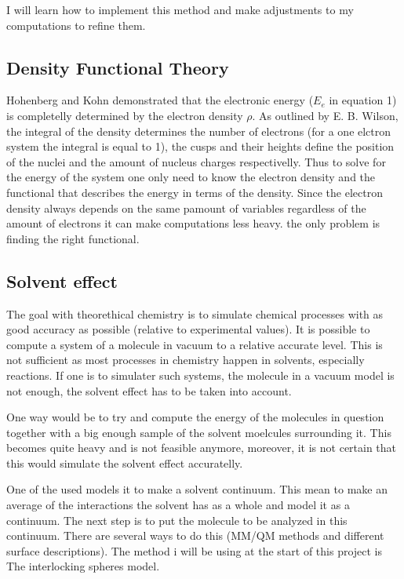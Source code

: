 \documentclass[a4paper,11pt]{article}
\begin{document}
I will learn how to implement this method and make adjustments to my computations to refine them.

\subsection{Density Functional Theory}

Hohenberg and Kohn %
demonstrated that the
electronic energy ($E_e$ in equation 1) is completelly determined by
the electron density $\rho$\cite{parr1994density}. As outlined by E. B. Wilson, %
the integral of the
density determines the number of electrons (for a one elctron system
the integral is equal to 1), the cusps and their heights define the
position of the nuclei and the amount of nucleus charges
respectivelly.  Thus to solve for the energy of the system one only
need to know the electron density and the functional that describes
the energy in terms of the density. Since the electron density always
depends on the same pamount of variables regardless of the amount of
electrons it can make computations less heavy. the only problem is
finding the right functional.


\subsection{Solvent effect}

The goal with theorethical chemistry is to simulate chemical processes
with as good accuracy as possible (relative to experimental
values). It is possible to compute a system of a molecule in vacuum to
a relative accurate level. This is not sufficient as most processes in
chemistry happen in solvents, especially reactions. If one is to
simulater such systems, the molecule in a vacuum model is not enough,
the solvent effect has to be taken into account.

One way would be to try and compute the energy of the molecules in
question together with a big enough sample of the solvent moelcules
surrounding it. This becomes quite heavy and is not feasible anymore,
moreover, it is not certain that this would simulate the solvent
effect accuratelly.

One of the used models it to make a solvent continuum. This mean to
make an average of the interactions the solvent has as a whole and
model it as a continuum. The next step is to put the molecule to be
analyzed in this continuum. There are several ways to do this (MM/QM
methods and different surface descriptions). The method i will be
using at the start of this project is The interlocking spheres model.
\end{document}
